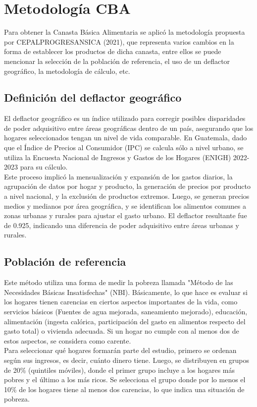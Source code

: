 \documentclass[letterpaper, 12pt, twoside]{article}
\begin{document}
\newpage

\section*{Metodología CBA}

Para obtener la Canasta Básica Alimentaria se aplicó la metodología propuesta
por CEPALPROGRESANSICA (2021), que representa varios cambios en la forma de
establecer los productos de dicha canasta, entre ellos se puede mencionar la
selección de la población de referencia, el uso de un deflactor geográfico, la
metodología de cálculo, etc.

\subsection{Definición del deflactor geográfico}

El deflactor geográfico es un índice utilizado para corregir posibles
disparidades de poder adquisitivo entre áreas geográficas dentro de un país,
asegurando que los hogares seleccionados tengan un nivel de vida comparable.
En Guatemala, dado que el Índice de Precios al Consumidor (IPC) se calcula sólo
a nivel urbano, se utiliza la Encuesta Nacional de Ingresos y Gastos de los
Hogares (ENIGH) 2022-2023 para su cálculo.
\\[\baselineskip]
Este proceso implicó la mensualización y expansión de los gastos diarios, la
agrupación de datos por hogar y producto, la generación de precios por producto
a nivel nacional, y la exclusión de productos extremos.
Luego, se generan precios medios y medianos por área geográfica, y se
identifican los alimentos comunes a zonas urbanas y rurales para ajustar el
gasto urbano.
El deflactor resultante fue de 0.925, indicando una diferencia de poder
adquisitivo entre áreas urbanas y rurales.

\subsection{Población de referencia}

Este método utiliza una forma de medir la pobreza llamada "Método de las
Necesidades Básicas Insatisfechas" (NBI).
Básicamente, lo que hace es evaluar si los hogares tienen carencias en ciertos
aspectos importantes de la vida, como servicios básicos (Fuentes de agua
mejorada, saneamiento mejorado), educación, alimentación (ingesta calórica,
participación del gasto en alimentos respecto del gasto total) o vivienda adecuada.
Si un hogar no cumple con al menos dos de estos aspectos, se considera como carente.
\\[\baselineskip]
Para seleccionar qué hogares formarán parte del estudio, primero se ordenan
según sus ingresos, es decir, cuánto dinero tiene.
Luego, se distribuyen en grupos de 20\% (quintiles móviles), donde el primer
grupo incluye a los hogares más pobres y el último a los más ricos.
Se selecciona el grupo donde por lo menos el 10\% de los hogares tiene al menos
dos carencias, lo que indica una situación de pobreza.
\end{document}
